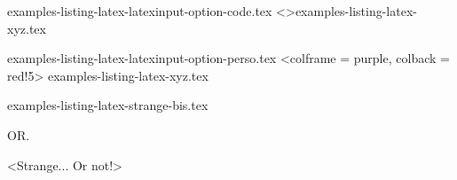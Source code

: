 \begin{filecontents*}[overwrite]{examples-listing-latex-latexinput-option-code.tex}
\tdoclatexinput<>{examples-listing-latex-xyz.tex}
\end{filecontents*}


\begin{filecontents*}[overwrite]{examples-listing-latex-latexinput-option-perso.tex}
\tdoclatexinput[style = igor, showspaces]%
               <colframe = purple, colback = red!5>%
               {examples-listing-latex-xyz.tex}
\end{filecontents*}


\begin{filecontents*}[overwrite]{examples-listing-latex-strange-bis.tex}
\begin{tdoclatex}
\end{tdoclatex}
OR.
\begin{tdoclatex}
\string<Strange... Or not!>
\end{tdoclatex}
\end{filecontents*}



\documentclass{tutodoc}

\usepackage[T1]{fontenc}

\usepackage[english]{babel, varioref}

\usepackage{enumitem}
\usepackage{fmtcount}

\usepackage{multicol}

\usepackage{tasks}

\usepackage{pdfpages}

\setlength{\parindent}{0em}

\newcommand\thisproj{\tdoccls{tutodoc}}
\newcommand\thisrepo{\url{https://github.com/bc-tools/for-latex/tree/tutodoc}}
\newcommand\thismonorepo{\url{https://github.com/bc-tools/for-latex}}


\newcommand\ctan{\href{https://ctan.org/}{\trademark{CTAN}}}
\newcommand\git{\trademark{git}}
\newcommand\pdf{\trademark{PDF}}

\newcommand\brainfuck{\trademark{Brainfuck}}
\newcommand\lua{\trademark{Lua}}
\newcommand\perl{\trademark{Perl}}
\newcommand\python{\trademark{Python}}

